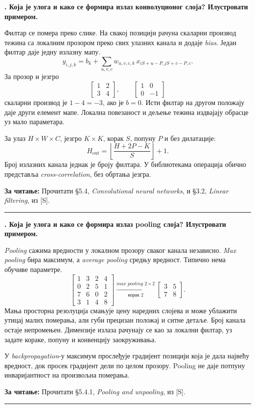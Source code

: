 \documentclass[10pt,a4paper]{article}
\newcommand{\en}[1]{\textit{#1}}
\newcounter{pitanje}
\newenvironment{odgovor}[1]{\stepcounter{pitanje}\begin{minipage}[t][0.455\textheight][t]{\textwidth}\vspace{0pt}\textbf{\thepitanje. #1}\par\smallskip}{\end{minipage}\par\ifodd\value{pitanje}\vspace{0.025\textheight}\hrule\vspace{0.015\textheight}\else\newpage\fi}
\newcommand{\izvor}[1]{\par\vfill{\footnotesize\textbf{За читање:} #1}\par}
\begin{document}
\begin{odgovor}{Која је улога и како се формира излаз конволуционог слоја? Илустровати примером.}
Филтар се помера преко слике. На свакој позицији рачуна скаларни производ тежина са локалним прозором преко свих улазних канала и додаје \en{bias}. Један филтар даје једну излазну мапу.
\[
y_{i,j,k}=b_k+\sum_{u,v,c}w_{u,v,c,k}\,x_{iS+u-P,jS+v-P,c}.
\]
За прозор и језгро
\[
\begin{bmatrix}1&2\\3&4\end{bmatrix},\qquad
\begin{bmatrix}1&0\\0&-1\end{bmatrix}
\]
скаларни производ је $1-4=-3$, ако је $b=0$. Исти филтар на другом положају даје други елемент мапе. Локална повезаност и дељење тежина издвајају обрасце уз мало параметара.

За улаз $H\times W\times C$, језгро $K\times K$, корак $S$, попуну $P$ и без дилатације:
\[
H_{\mathrm{out}}=\left\lfloor\frac{H+2P-K}{S}\right\rfloor+1.
\]
Број излазних канала једнак је броју филтара. У библиотекама операција обично представља \en{cross-correlation}, без обртања језгра.
\izvor{Прочитати §5.4, \en{Convolutional neural networks}, и §3.2, \en{Linear filtering}, из [S].}
\end{odgovor}

\begin{odgovor}{Која је улога и како се формира излаз pooling слоја? Илустровати примером.}
\en{Pooling} сажима вредности у локалном прозору сваког канала независно. \en{Max pooling} бира максимум, а \en{average pooling} средњу вредност. Типично нема обучиве параметре.
\[
\begin{bmatrix}
1&3&2&4\\
0&2&5&1\\
7&6&0&2\\
3&1&4&8
\end{bmatrix}
\xrightarrow[\text{корак }2]{\textit{max pooling }2\times2}
\begin{bmatrix}3&5\\7&8\end{bmatrix}.
\]
Мања просторна резолуција смањује цену наредних слојева и може ублажити утицај малих померања, али губи прецизан положај и ситне детаље. Број канала остаје непромењен. Димензије излаза рачунају се као за локални филтар, уз задате кораке, попуну и конвенцију заокруживања.

У \en{backpropagation}-у максимум прослеђује градијент позицији која је дала највећу вредност, док просек градијент дели по целом прозору. Pooling не даје потпуну инваријантност на произвољна померања.
\izvor{Прочитати §5.4.1, \en{Pooling and unpooling}, из [S].}
\end{odgovor}
\end{document}
